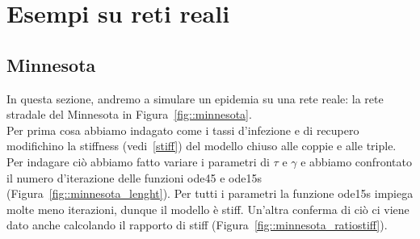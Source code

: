 \chapter{Esempi su reti reali}
\section{Minnesota}
In questa sezione, andremo a simulare un epidemia su una rete reale: la rete stradale del Minnesota in Figura~\ref{fig::minnesota}.\\
Per prima cosa abbiamo indagato come  i tassi d'infezione e di recupero modifichino la stiffness (vedi~\ref{stiff}) del modello chiuso alle coppie e alle triple.\\
Per indagare ci\`o abbiamo fatto variare i parametri di $\tau$ e $\gamma$ e abbiamo confrontato il numero d'iterazione delle funzioni ode45 e ode15s (Figura~\ref{fig::minnesota_lenght}). Per tutti i parametri la funzione ode15s impiega molte meno iterazioni, dunque il modello \`e stiff. Un'altra conferma di ci\`o ci viene dato anche calcolando il rapporto di stiff (Figura~\ref{fig::minnesota_ratiostiff}).\\ \\ 

